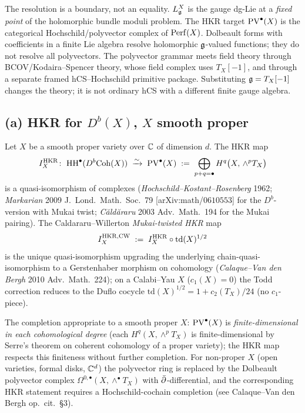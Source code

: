 The resolution is a boundary, not an equality. $L_{\mathfrak{g}}^X$ is the
gauge dg-Lie at a \emph{fixed point} of the holomorphic bundle moduli
problem. The HKR target $\mathrm{PV}^\bullet(X)$ is the categorical
Hochschild/polyvector complex of $\mathrm{Perf}(X)$. Dolbeault forms with
coefficients in a finite Lie algebra resolve holomorphic
$\mathfrak{g}$-valued functions; they do not resolve all polyvectors. The
polyvector grammar meets field theory through BCOV/Kodaira--Spencer
theory, whose field complex uses $T_X[-1]$, and through a separate
framed hCS--Hochschild primitive package. Substituting
$\mathfrak{g}=T_X[-1]$ changes the theory; it is not ordinary hCS with a
different finite gauge algebra.

\subsection*{(a) HKR for $D^b(X)$, $X$ smooth proper}

\begin{theorem}
\label{thm:hkr-Db-X}
Let $X$ be a smooth proper variety over $\mathbb{C}$ of dimension $d$. The
HKR map
\[
 I^{\mathrm{HKR}}_X \colon\;
 \mathrm{HH}^\bullet(D^b\mathrm{Coh}(X))
 \;\xrightarrow{\sim}\;
 \mathrm{PV}^\bullet(X)
 \;:=\; \bigoplus_{p+q=\bullet}
 H^q\bigl(X,\,\wedge^p T_X\bigr)
\]
is a quasi-isomorphism of complexes
(\emph{Hochschild--Kostant--Rosenberg} 1962;
\emph{Markarian} 2009 J.\ Lond.\ Math.\ Soc.\ 79
\textup{[}arXiv:math/$0610553$\textup{]} for the $D^b$-version with
Mukai twist;
\emph{C\u ald\u araru} 2003 Adv.\ Math.\ 194
for the Mukai pairing). The Caldararu--Willerton \emph{Mukai-twisted
HKR} map
\[
 I^{\mathrm{HKR},\mathrm{CW}}_X \;:=\; I^{\mathrm{HKR}}_X \circ \mathrm{td}(X)^{1/2}
\]
is the unique quasi-isomorphism upgrading the underlying
chain-quasi-isomorphism to a Gerstenhaber morphism on cohomology
(\emph{Calaque--Van den Bergh} 2010 Adv.\ Math.\ 224); on a Calabi--Yau
$X$ ($c_1(X)=0$) the Todd correction reduces to the Duflo cocycle
$\mathrm{td}(X)^{1/2} = 1 + c_2(T_X)/24$ (no $c_1$-piece).
\end{theorem}

The completion appropriate to a smooth proper $X$: $\mathrm{PV}^\bullet(X)$ is
\emph{finite-dimensional in each cohomological degree} (each
$H^q(X,\wedge^p T_X)$ is finite-dimensional by Serre's theorem on
coherent cohomology of a proper variety); the HKR map respects this
finiteness without further completion. For non-proper $X$ (open
varieties, formal disks, $\mathbb{C}^d$) the polyvector ring is replaced by
the Dolbeault polyvector complex
$\Omega^{0,\bullet}(X, \wedge^\bullet T_X)$ with $\bar\partial$-differential,
and the corresponding HKR statement requires a Hochschild-cochain
completion (see Calaque--Van den Bergh op.\ cit.\ \S$3$).

